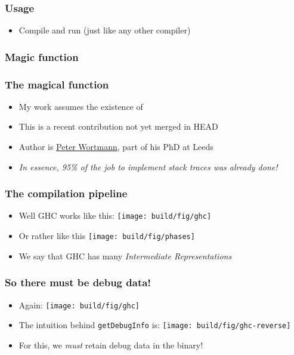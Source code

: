 \documentclass[11pt]{beamer} %
\begin{document}
  \begin{frame}
   \frametitle{Usage}
  \begin{itemize}
   \item Compile and run (just like any other compiler)
     \useGhcCode
  \end{itemize}
  \end{frame}

\subsubsection{Magic function}
  \begin{frame}
   \frametitle{The magical function}
  \begin{itemize}
   \item <1-> My work assumes the existence of
     \getDebugInfoCode
   \item <2-> This is a recent contribution not yet merged in HEAD 
   \item <2-> Author is
     \href{http://www.personal.leeds.ac.uk/~scpmw/site.html}{Peter Wortmann},
     part of his PhD at Leeds
   \item <3-> \emph{In essence, 95\% of the job to implement stack traces was
       already done!}
  \end{itemize}
  \end{frame}

  \begin{frame}
   \frametitle{The compilation pipeline}
  \begin{itemize}
   \item <1-> Well GHC works like this:
     \texttt{[image: build/fig/ghc]}
   \item <2-> Or rather like this
     \texttt{[image: build/fig/phases]}
   \item <3-> We say that GHC has many \emph{Intermediate Representations}
  \end{itemize}
  \end{frame}

  \begin{frame}
   \frametitle{So there must be debug data!}
  \begin{itemize}
   \item <1-> Again:
     \texttt{[image: build/fig/ghc]}
   \item <2-> The intuition behind \texttt{getDebugInfo} is:
     \texttt{[image: build/fig/ghc-reverse]}
   \item <3-> For this, we \emph{must} retain debug data in the binary!
  \end{itemize}
  \end{frame}
\end{document}
